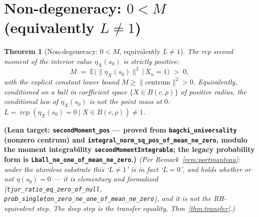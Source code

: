 \documentclass[11pt,a4paper]{article}
\newtheorem{theorem}{Theorem}[section]
\theoremstyle{definition}
\newcommand{\etaX}{\eta_X}
\newcommand{\rcp}{\operatorname{rcp}}
\begin{document}
\section{Non-degeneracy: \texorpdfstring{$0<M$}{0 < M} (equivalently \texorpdfstring{$L\neq 1$}{L != 1})}\label{sec:nondetect}

\begin{theorem}[Non-degeneracy: \(0<M\), equivalently \(L\neq1\)]\label{thm:nondetect}
The rcp \emph{second moment} of the interior value \(\etaX(s_0)\) is strictly positive:
\[
  M \;=\; \mathbb{E}\bigl(\|\etaX(s_0)\|^2 \,\big|\, X_n=1\bigr) \;>\; 0 ,
\]
with the explicit constant lower bound \(M\ge\|\text{centrum}\|^2>0\). Equivalently, conditioned on a
\emph{ball in coefficient space} \(\{X\in B(c,\rho)\}\) of positive radius, the conditional law of
\(\etaX(s_0)\) is not the point mass at \(0\): \(L=\rcp(\etaX(s_0)=0\mid X\in B(c,\rho))\neq1\).
\end{theorem}
\textbf{(Lean target: \texttt{secondMoment\_pos} --- proved from \texttt{bagchi\_universality}
(nonzero centrum) and \texttt{integral\_norm\_sq\_pos\_of\_mean\_ne\_zero}, modulo the moment
integrability \texttt{secondMomentIntegrable}; the legacy probability form is
\texttt{Lball\_ne\_one\_of\_mean\_ne\_zero}.)}
\emph{(Per Remark~\ref{rem:portmanteau}: under the atomless substrate this `\(L\neq1\)' is in fact
`\(L=0\)', and holds whether or not \(\eta(s_0)=0\) --- it is elementary and formalized
(\texttt{tjur\_ratio\_eq\_zero\_of\_null}, \texttt{prob\_singleton\_zero\_ne\_one\_of\_mean\_ne\_zero}),
and it is \emph{not} the RH-equivalent step. The deep step is the transfer equality,
Thm~\ref{thm:transfer}.)}
\end{document}
